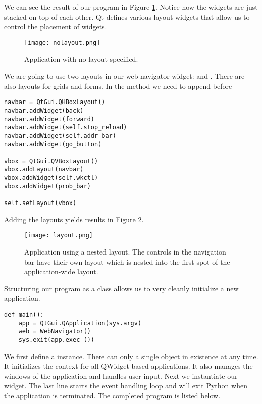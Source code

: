 We can see the result of our program in Figure \ref{fig:nolayout}.
Notice how the widgets are just stacked on top of each other.
Qt defines various layout widgets that allow us to control the placement of widgets. 
\begin{figure}[h]
\centering
\texttt{[image: nolayout.png]}
\caption{Application with no layout specified.}
\label{fig:nolayout}
\end{figure}
We are going to use two layouts in our web navigator widget:  and .
There are also layouts for grids and forms.
In the  method we need to append before 
\begin{lstlisting}
navbar = QtGui.QHBoxLayout()
navbar.addWidget(back)
navbar.addWidget(forward)
navbar.addWidget(self.stop_reload)
navbar.addWidget(self.addr_bar)
navbar.addWidget(go_button)

vbox = QtGui.QVBoxLayout()
vbox.addLayout(navbar)
vbox.addWidget(self.wkctl)
vbox.addWidget(prob_bar)

self.setLayout(vbox)
\end{lstlisting}
Adding the layouts yields results in Figure \ref{fig:withlayout}.
\begin{figure}[h]
\centering
\texttt{[image: layout.png]}
\caption{Application using a nested layout.
The controls in the navigation bar have their own layout which is nested into the first spot of the application-wide layout.}
\label{fig:withlayout}
\end{figure}

Structuring our program as a class allows us to very cleanly initialize a new application.
\begin{lstlisting}
def main():
    app = QtGui.QApplication(sys.argv)
    web = WebNavigator()
    sys.exit(app.exec_())
\end{lstlisting}
We first define a  instance.
There can only a single  object in existence at any time.
It initializes the context for all QWidget based applications.
It also manages the windows of the application and handles user input.
Next we instantiate our  widget.
The last line starts the event handling loop and will exit Python when the application is terminated.
The completed program is listed below.


